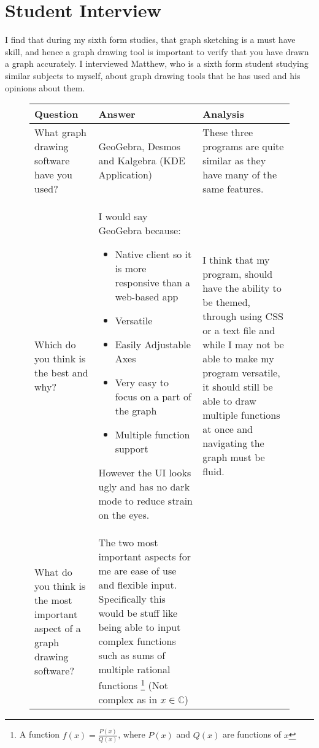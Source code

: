 \documentclass[../../../main.tex]{subfiles}
\begin{document}
\newpage
\section{Student Interview}
I find that during my sixth form studies, that graph sketching is a must have skill, and hence a graph drawing tool is important to verify that you have drawn a graph accurately. I interviewed Matthew, who is a sixth form student studying similar subjects to myself, about graph drawing tools that he has used and his opinions about them.

\begin{savenotes}
	\begin{figure}[H]
	
	\centering
		\begin{tabular}{|L{0.15\textwidth}|m{0.5\textwidth}|L{0.25\textwidth}|}
		\hline
		\Centering Question & \Centering Answer & \Centering Analysis \\
		\hline
		What graph drawing software have you used? &  
		GeoGebra, Desmos and Kalgebra (KDE Application) & 
		These three programs are quite similar as they have many of the same features.
		 \\ \hline
		Which do you think is the best and why? & 
		I would say GeoGebra because:
		\begin{itemize}
		\item Native client so it is more responsive than a web-based app
		\item Versatile
		\item Easily Adjustable Axes
		\item Very easy to focus on a part of the graph 
		\item Multiple function support
		\end{itemize}
		However the UI looks ugly and has no dark mode to reduce strain on the eyes.
		&
		I think that my program, should have the ability to be themed, through using CSS or a text file and while I may not be able to make my program versatile, it should still be able to draw multiple functions at once and navigating the graph must be fluid.
		\\ \hline
		What do you think is the most important
		aspect of a graph drawing software?
		&
		The two most important aspects for me are ease of use and flexible input. Specifically this would be stuff like being able to input complex functions such as sums of multiple rational functions
		\footnote{A function $f(x) = \frac{P(x)}{Q(x)}$, where $P(x)$ and $Q(x)$ are functions of $x$} (Not complex as in $x\in \mathbb{C}$)

\end{tabular}
\end{figure}
\end{savenotes}
\end{document}
